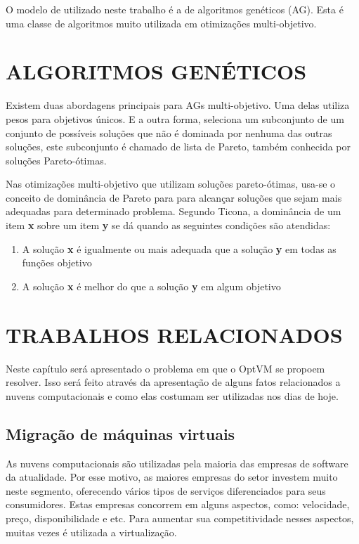 O modelo de utilizado neste trabalho é a de algoritmos genéticos (AG). Esta é uma classe de 
algoritmos muito utilizada em otimizações multi-objetivo.

\section{ALGORITMOS GENÉTICOS}
Existem duas abordagens principais para AGs multi-objetivo. Uma delas utiliza pesos para objetivos 
únicos. E a outra forma, seleciona um subconjunto de um conjunto de possíveis soluções que não é 
dominada por nenhuma das outras soluções, este subconjunto é chamado de lista de Pareto, 
também conhecida por soluções Pareto-ótimas.

Nas otimizações multi-objetivo que utilizam soluções pareto-ótimas, usa-se o conceito de 
dominância de Pareto para  para alcançar soluções que sejam mais  adequadas para determinado problema. 
Segundo Ticona\cite{ticona}, a dominância de um item \textbf{x} sobre um item \textbf{y} se dá quando 
as seguintes condições são atendidas:

\begin{enumerate}
\item A solução \textbf{x} é igualmente ou mais adequada que a solução \textbf{y} em todas as funções objetivo
\item A solução \textbf{x} é melhor do que a solução \textbf{y} em algum objetivo
\end{enumerate}

\section{TRABALHOS RELACIONADOS}
Neste capítulo será apresentado o problema em que o OptVM se propoem resolver. 
Isso será feito através da apresentação de alguns fatos relacionados a nuvens computacionais 
e como elas costumam ser utilizadas nos dias de hoje.

\subsection{Migração de máquinas virtuais}
As nuvens computacionais são utilizadas pela maioria das empresas de software da atualidade. 
Por esse motivo, as maiores empresas do setor investem muito neste segmento, 
oferecendo vários tipos de serviços diferenciados para seus consumidores. 
Estas empresas concorrem em alguns aspectos, como: velocidade, preço, disponibilidade e etc. 
Para aumentar sua competitividade nesses aspectos, muitas vezes é utilizada a virtualização.

